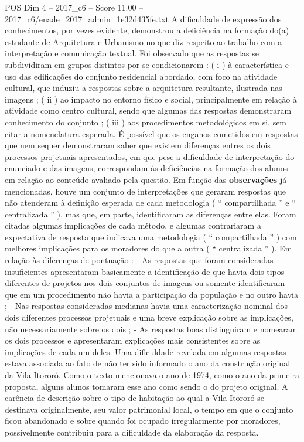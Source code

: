 \begin{textsample}{POS Dim 4 – 2017\_c6 – Score 11.00 – 2017\_c6/enade\_2017\_admin\_1e32d435fe.txt}
A dificuldade de expressão dos conhecimentos, por vezes evidente, demonstrou a deficiência na formação do(a) estudante de Arquitetura e Urbanismo no que diz respeito ao trabalho com a interpretação e comunicação textual.
Foi observado que as respostas se subdividiram em grupos distintos por se condicionarem : ( i ) à característica e uso das edificações do conjunto residencial abordado, com foco na atividade cultural, que induziu a respostas sobre a arquitetura resultante, ilustrada nas imagens ; ( ii ) ao impacto no entorno físico e social, principalmente em relação à atividade como centro cultural, sendo que algumas das respostas demonstraram conhecimento do conjunto ; ( iii ) aos procedimentos metodológicos em si, sem citar a nomenclatura esperada.
É possível que os enganos cometidos em respostas que nem sequer demonstraram saber que existem diferenças entres os dois processos projetuais apresentados, em que pese a dificuldade de interpretação do enunciado e das imagens, correspondam às deficiências na formação dos alunos em relação ao conteúdo avaliado pela questão.
Em função das \textbf{observações} já mencionadas, houve um conjunto de interpretações que geraram respostas que não atenderam à definição esperada de cada metodologia ( “ compartilhada ” e “ centralizada ” ), mas que, em parte, identificaram as diferenças entre elas.
Foram citadas algumas implicações de cada método, e algumas contrariaram a expectativa de resposta que indicava uma metodologia ( “ compartilhada ” ) com melhores implicações para os moradores do que a outra ( “ centralizada ” ).
Em relação às diferenças de pontuação : - As respostas que foram consideradas insuficientes apresentaram basicamente a identificação de que havia dois tipos diferentes de projetos nos dois conjuntos de imagens ou somente identificaram que em um procedimento não havia a participação da população e no outro havia ; - Nas respostas consideradas medianas havia uma caracterização nominal dos dois diferentes processos projetuais e uma breve explicação sobre as implicações, não necessariamente sobre os dois ; - As respostas boas distinguiram e nomearam os dois processos e apresentaram explicações mais consistentes sobre as implicações de cada um deles.
Uma dificuldade revelada em algumas respostas estava associada ao fato de não ter sido informado o ano da construção original da Vila Itororó.
Como o texto mencionava o ano de 1974, como o ano da primeira proposta, alguns alunos tomaram esse ano como sendo o do projeto original.
A carência de descrição sobre o tipo de habitação ao qual a Vila Itororó se destinava originalmente, seu valor patrimonial local, o tempo em que o conjunto ficou abandonado e sobre quando foi ocupado irregularmente por moradores, possivelmente contribuiu para a dificuldade da elaboração da resposta.

\end{textsample}
